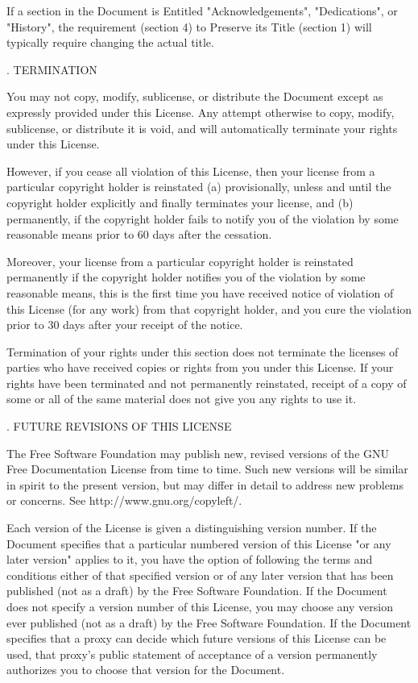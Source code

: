 If a section in the Document is Entitled "Acknowledgements", "Dedications", or "History", the requirement (section 4) to Preserve its Title (section 1) will typically require changing the actual title.

. TERMINATION

You may not copy, modify, sublicense, or distribute the Document except as expressly provided under this License. Any attempt otherwise to copy, modify, sublicense, or distribute it is void, and will automatically terminate your rights under this License.

However, if you cease all violation of this License, then your license from a particular copyright holder is reinstated (a) provisionally, unless and until the copyright holder explicitly and finally terminates your license, and (b) permanently, if the copyright holder fails to notify you of the violation by some reasonable means prior to 60 days after the cessation.

Moreover, your license from a particular copyright holder is reinstated permanently if the copyright holder notifies you of the violation by some reasonable means, this is the first time you have received notice of violation of this License (for any work) from that copyright holder, and you cure the violation prior to 30 days after your receipt of the notice.

Termination of your rights under this section does not terminate the licenses of parties who have received copies or rights from you under this License. If your rights have been terminated and not permanently reinstated, receipt of a copy of some or all of the same material does not give you any rights to use it.

. FUTURE REVISIONS OF THIS LICENSE

The Free Software Foundation may publish new, revised versions of the GNU Free Documentation License from time to time. Such new versions will be similar in spirit to the present version, but may differ in detail to address new problems or concerns. See http://www.gnu.org/copyleft/.

Each version of the License is given a distinguishing version number. If the Document specifies that a particular numbered version of this License "or any later version" applies to it, you have the option of following the terms and conditions either of that specified version or of any later version that has been published (not as a draft) by the Free Software Foundation. If the Document does not specify a version number of this License, you may choose any version ever published (not as a draft) by the Free Software Foundation. If the Document specifies that a proxy can decide which future versions of this License can be used, that proxy's public statement of acceptance of a version permanently authorizes you to choose that version for the Document.

